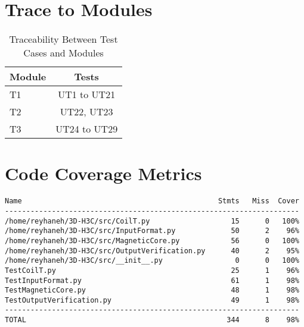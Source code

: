 \documentclass[12pt, titlepage]{article}
\begin{document}
\section{Trace to Modules}		
\begin{table}[h]
  \centering
  \caption{Traceability Between Test Cases and Modules}
  \vspace{3mm}
  \label{tab:my-table}
  \begin{tabular}{l|c}
    Module         & Tests \\ \hline
    T1 & UT1 to UT21\\
    T2 & UT22, UT23\\
    T3 &  UT24 to UT29\\
  \end{tabular}
 \end{table}
\section{Code Coverage Metrics}
\begin{small}
\begin{verbatim}
Name                                              Stmts   Miss  Cover
---------------------------------------------------------------------
/home/reyhaneh/3D-H3C/src/CoilT.py                   15      0   100%
/home/reyhaneh/3D-H3C/src/InputFormat.py             50      2    96%
/home/reyhaneh/3D-H3C/src/MagneticCore.py            56      0   100%
/home/reyhaneh/3D-H3C/src/OutputVerification.py      40      2    95%
/home/reyhaneh/3D-H3C/src/__init__.py                 0      0   100%
TestCoilT.py                                         25      1    96%
TestInputFormat.py                                   61      1    98%
TestMagneticCore.py                                  48      1    98%
TestOutputVerification.py                            49      1    98%
---------------------------------------------------------------------
TOTAL                                               344      8    98%


\end{verbatim}
\end{small}


\end{document}
